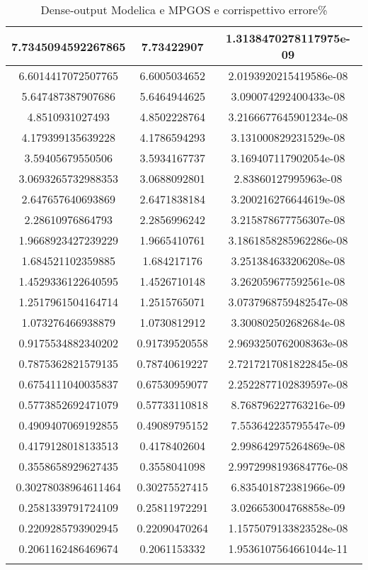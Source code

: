 \begin{longtable}[!h]{|c|c|c|}
    \hline
    7.7345094592267865 & 7.73422907 & 1.3138470278117975e-09\\
    \hline
    6.6014417072507765 & 6.6005034652 & 2.0193920215419586e-08\\
    \hline
    5.647487387907686 & 5.6464944625 & 3.090074292400433e-08\\
    \hline
    4.8510931027493 & 4.8502228764 & 3.2166677645901234e-08\\
    \hline
    4.179399135639228 & 4.1786594293 & 3.131000829231529e-08\\
    \hline
    3.59405679550506 & 3.5934167737 & 3.169407117902054e-08\\
    \hline
    3.0693265732988353 & 3.0688092801 & 2.83860127995963e-08\\
    \hline
    2.647657640693869 & 2.6471838184 & 3.200216276644619e-08\\
    \hline
    2.28610976864793 & 2.2856996242 & 3.215878677756307e-08\\
    \hline
    1.9668923427239229 & 1.9665410761 & 3.1861858285962286e-08\\
    \hline
    1.684521102359885 & 1.684217176 & 3.251384633206208e-08\\
    \hline
    1.4529336122640595 & 1.4526710148 & 3.262059677592561e-08\\
    \hline
    1.2517961504164714 & 1.2515765071 & 3.0737968759482547e-08\\
    \hline
    1.073276466938879 & 1.0730812912 & 3.300802502682684e-08\\
    \hline
    0.9175534882340202 & 0.91739520558 & 2.9693250762008363e-08\\
    \hline
    0.7875362821579135 & 0.78740619227 & 2.7217217081822845e-08\\
    \hline
    0.6754111040035837 & 0.67530959077 & 2.2522877102839597e-08\\
    \hline
    0.5773852692471079 & 0.57733110818 & 8.768796227763216e-09\\
    \hline
    0.4909407069192855 & 0.49089795152 & 7.553642235795547e-09\\
    \hline
    0.4179128018133513 & 0.4178402604 & 2.998642975264869e-08\\
    \hline
    0.3558658929627435 & 0.3558041098 & 2.9972998193684776e-08\\
    \hline
    0.30278038964611464 & 0.30275527415 & 6.835401872381966e-09\\
    \hline
    0.2581339791724109 & 0.25811972291 & 3.026653004768858e-09\\
    \hline
    0.2209285793902945 & 0.22090470264 & 1.1575079133823528e-08\\
    \hline
    0.2061162486469674 & 0.2061153332 & 1.9536107564661044e-11\\
    \hline
    \caption{Dense-output Modelica e MPGOS e corrispettivo errore\%}
    \label{tbl:denseoutput}
\end{longtable}
